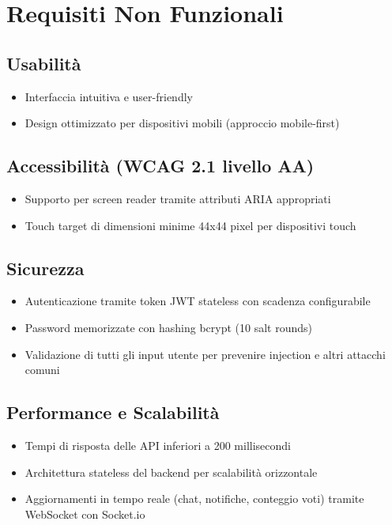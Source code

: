 \documentclass{report}
\begin{document}
\section{Requisiti Non Funzionali}

\subsection{Usabilità}
\begin{itemize}
    \item Interfaccia intuitiva e user-friendly
    \item Design ottimizzato per dispositivi mobili (approccio mobile-first)
\end{itemize}

\subsection{Accessibilità (WCAG 2.1 livello AA)}
\begin{itemize}
    \item Supporto per screen reader tramite attributi ARIA appropriati
    \item Touch target di dimensioni minime 44x44 pixel per dispositivi touch
\end{itemize}

\subsection{Sicurezza}
\begin{itemize}
    \item Autenticazione tramite token JWT stateless con scadenza configurabile
    \item Password memorizzate con hashing bcrypt (10 salt rounds)
    \item Validazione di tutti gli input utente per prevenire injection e altri attacchi comuni
\end{itemize}

\subsection{Performance e Scalabilità}
\begin{itemize}
    \item Tempi di risposta delle API inferiori a 200 millisecondi
    \item Architettura stateless del backend per scalabilità orizzontale
    \item Aggiornamenti in tempo reale (chat, notifiche, conteggio voti) tramite WebSocket con Socket.io
\end{itemize} 
\end{document}
